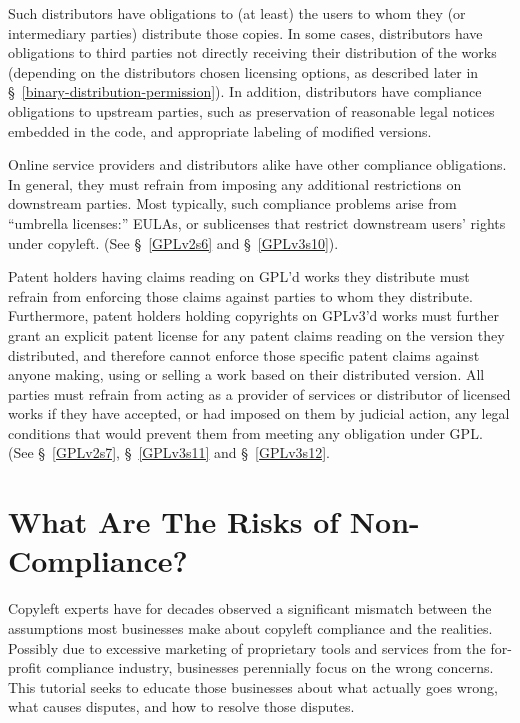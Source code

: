 Such distributors have obligations to (at least) the users to whom they (or
intermediary parties) distribute those copies.  In some cases, distributors
have obligations to third parties not directly receiving their distribution
of the works (depending on the distributors chosen licensing options, as
described later in \S~\ref{binary-distribution-permission}).  In addition,
distributors have compliance obligations to upstream parties, such as
preservation of reasonable legal notices embedded in the code, and
appropriate labeling of modified versions.

Online service providers and distributors alike have other compliance
obligations.  In general, they must refrain from imposing any additional
restrictions on downstream parties. Most typically, such compliance problems
arise from ``umbrella licenses:'' EULAs, or sublicenses that restrict
downstream users' rights under copyleft. (See \S~\ref{GPLv2s6} and
\S~\ref{GPLv3s10}).

Patent holders having claims reading on GPL'd works they distribute must
refrain from enforcing those claims against parties to whom they distribute.
Furthermore, patent holders holding copyrights on GPLv3'd works must further
grant an explicit patent license for any patent claims reading on the version
they distributed, and therefore cannot enforce those specific patent claims
against anyone making, using or selling a work based on their distributed
version.  All parties must refrain from acting as a provider of services or
distributor of licensed works if they have accepted, or had imposed on them
by judicial action, any legal conditions that would prevent them from meeting
any obligation under GPL\@.  (See \S~\ref{GPLv2s7}, \S~\ref{GPLv3s11} and
\S~\ref{GPLv3s12}.

\section{What Are The Risks of Non-Compliance?}

Copyleft experts have for decades observed a significant mismatch between the
assumptions most businesses make about copyleft compliance and the realities.
Possibly due to excessive marketing of proprietary tools and services from
the for-profit compliance industry, businesses perennially focus on the wrong
concerns.  This tutorial seeks to educate those businesses about what
actually goes wrong, what causes disputes, and how to resolve those disputes.

